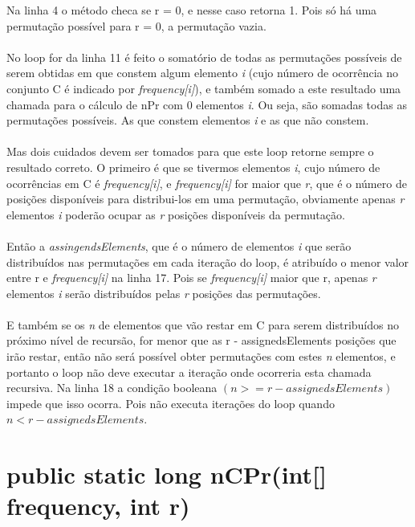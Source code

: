 \documentclass[a4paper,12pt,openany]{book}
\begin{document}
Na linha 4 o método checa se r = 0, e nesse caso retorna 1. Pois só há uma permutação possível para r = 0, a permutação vazia. 
\\
\\
No loop for da linha 11 é feito o somatório de todas as permutações possíveis de serem obtidas em que constem algum elemento \textit{i} (cujo número de ocorrência no conjunto C é indicado por \textit{frequency[i]}), e também somado a este resultado uma chamada para o cálculo de nPr com 0 elementos \textit{i}. Ou seja, são somadas todas as permutações possíveis. As que constem elementos \textit{i} e as que não constem.
\\
\\
Mas dois cuidados devem ser tomados para que este loop retorne sempre o resultado correto. O primeiro é que se tivermos elementos \textit{ i}, cujo número de ocorrências em C é \textit{frequency[i]}, e \textit{frequency[i]} for maior que \textit{r}, que é o número de posições disponíveis para distribui-los em uma permutação, obviamente apenas \textit{r} elementos \textit{i} poderão ocupar as \textit{r} posições disponíveis da permutação.
\\
\\
Então a \textit{assingendsElements}, que é o número de elementos \textit{i} que serão distribuídos nas permutações em cada iteração do loop, é atribuído o menor valor entre r e \textit{frequency[i]} na linha 17. Pois se \textit{frequency[i]} maior que r, apenas \textit{r} elementos \textit{i} serão distribuídos pelas \textit{r} posições das permutações.
\\
\\
E também se os \textit{n} de elementos que vão restar em C para serem distribuídos no próximo nível de recursão, for menor que as r - assignedsElements posições que irão restar, então não será possível obter permutações com estes \textit{n} elementos, e portanto o loop não deve executar a iteração onde ocorreria esta chamada recursiva. Na linha 18 a condição booleana $(n >= r - assignedsElements)$ impede que isso ocorra. Pois não executa iterações do loop quando $ n < r - assignedsElements $.
 

\section*{public static long nCPr(int[] frequency, int r)}
\end{document}
